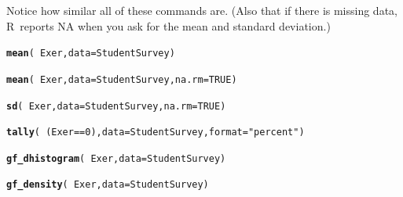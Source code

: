 \documentclass[twoside]{book}\usepackage[]{graphicx}\usepackage[]{xcolor}
\makeatletter
\newcommand{\hlnum}[1]{\textcolor[rgb]{0.686,0.059,0.569}{#1}}%
\newcommand{\hlstr}[1]{\textcolor[rgb]{0.192,0.494,0.8}{#1}}%
\newcommand{\hlopt}[1]{\textcolor[rgb]{0,0,0}{#1}}%
\newcommand{\hlstd}[1]{\textcolor[rgb]{0.345,0.345,0.345}{#1}}%
\newcommand{\hlkwc}[1]{\textcolor[rgb]{0.333,0.667,0.333}{#1}}%
\newcommand{\hlkwd}[1]{\textcolor[rgb]{0.737,0.353,0.396}{\textbf{#1}}}%
\newenvironment{kframe}{%
 \def\at@end@of@kframe{}%
 \ifinner\ifhmode%
  \def\at@end@of@kframe{\end{minipage}}%
  \begin{minipage}{\columnwidth}%
 \fi\fi%
 \def\FrameCommand##1{\hskip\@totalleftmargin \hskip-\fboxsep
 \colorbox{shadecolor}{##1}\hskip-\fboxsep
     \hskip-\linewidth \hskip-\@totalleftmargin \hskip\columnwidth}%
 \MakeFramed {\advance\hsize-\width
   \@totalleftmargin\z@ \linewidth\hsize
   \@setminipage}}%
 {\par\unskip\endMakeFramed%
 \at@end@of@kframe}
\newenvironment{knitrout}{}{} %
\def\R{{\sf R}}
\makeatother
\begin{document}
\begin{solution}
Notice how similar all of these commands are.  (Also that if there is missing data, \R\ reports
NA when you ask for the mean and standard deviation.)
\begin{knitrout}
\color{fgcolor}\begin{kframe}
\begin{alltt}
\hlkwd{mean}\hlstd{(} \hlopt{~} \hlstd{Exer,} \hlkwc{data} \hlstd{= StudentSurvey)}
\end{alltt}


{\ttfamily\noindent\bfseries{}}\begin{alltt}
\hlkwd{mean}\hlstd{(} \hlopt{~} \hlstd{Exer,} \hlkwc{data} \hlstd{= StudentSurvey,} \hlkwc{na.rm} \hlstd{=} \hlnum{TRUE}\hlstd{)}
\end{alltt}


{\ttfamily\noindent\bfseries{}}\begin{alltt}
\hlkwd{sd}\hlstd{(} \hlopt{~} \hlstd{Exer,} \hlkwc{data} \hlstd{= StudentSurvey,} \hlkwc{na.rm} \hlstd{=} \hlnum{TRUE}\hlstd{)}
\end{alltt}


{\ttfamily\noindent\bfseries{}}\begin{alltt}
\hlkwd{tally}\hlstd{(} \hlopt{~} \hlstd{(Exer} \hlopt{==} \hlnum{0}\hlstd{) ,} \hlkwc{data} \hlstd{= StudentSurvey,} \hlkwc{format} \hlstd{=} \hlstr{"percent"}\hlstd{)}
\end{alltt}


{\ttfamily\noindent\bfseries\color{errorcolor}{\#\# Error in eval(x, data, env): object 'StudentSurvey' not found}}\begin{alltt}
\hlkwd{gf_dhistogram}\hlstd{(} \hlopt{~} \hlstd{Exer,} \hlkwc{data} \hlstd{= StudentSurvey)}
\end{alltt}


{\ttfamily\noindent\bfseries\color{errorcolor}{\#\# Error in gf\_ingredients(formula = gformula, data = data, gg\_object = object, : object 'StudentSurvey' not found}}\begin{alltt}
\hlkwd{gf_density}\hlstd{(} \hlopt{~} \hlstd{Exer,} \hlkwc{data} \hlstd{= StudentSurvey)}
\end{alltt}



\end{kframe}
\end{knitrout}
\end{solution}
\end{document}
